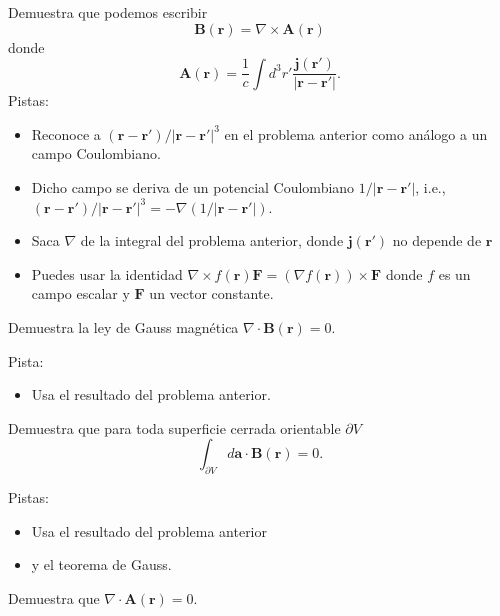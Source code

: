 \documentclass{exam}
\begin{document}
\begin{questions}
  \question Demuestra que podemos escribir
    $$ \bm B(\bm r)=\nabla\times \bm A(\bm r)$$
    donde
    $$ \bm A(\bm r)=\frac{1}{c}\int d^3r' \frac{\bm j(\bm r')}{|\bm
      r-\bm r'|}.
    $$
    Pistas:
    \begin{itemize}
    \item Reconoce a $(\bm r-\bm r')/|\bm r-\bm r'|^3$ en el problema
      anterior como análogo a un campo Coulombiano.
    \item Dicho campo se deriva de un potencial Coulombiano $1/|\bm
      r-\bm r'|$, i.e.,
      $(\bm r-\bm r')/|\bm r-\bm r'|^3=-\nabla (1/|\bm r-\bm r'|)$.
    \item Saca $\nabla$ de la integral del problema anterior, donde
      $\bm j(\bm r')$ no depende de $\bm r$
    \item Puedes usar la identidad $\nabla \times f(\bm r) \bm
      F=(\nabla f(\bm r))\times \bm F$ donde $f$ es un campo escalar y
      $\bm F$ un vector constante.
    \end{itemize}
  \question Demuestra la ley de Gauss magnética $\nabla\cdot \bm B(\bm r)=0$.

    Pista:
    \begin{itemize}
    \item Usa el resultado del problema anterior.
    \end{itemize}

  \question Demuestra que para toda superficie cerrada orientable
    $\partial V$
    $$\int_{\partial V}d\bm a\cdot\bm B(\bm r)=0.$$

    Pistas:
    \begin{itemize}
    \item Usa el resultado del problema anterior
    \item y el teorema de Gauss.
    \end{itemize}
  \question Demuestra que $\nabla\cdot\bm A(\bm r)=0$.


\end{questions}
\end{document}
